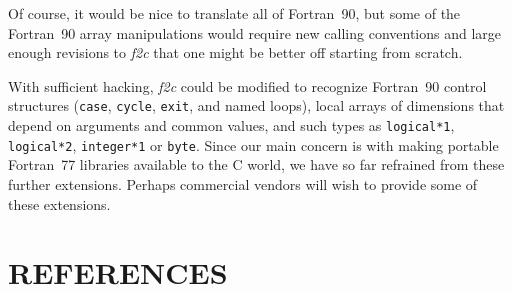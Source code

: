 \documentclass[12pt]{article}
\begin{document}
Of course, it would be nice to translate all of Fortran~90, but some of the Fortran~90 array manipulations would require new calling conventions and large enough revisions to \emph{f2c} that one might be better off starting from scratch.

With sufficient hacking, \emph{f2c} could be modified to recognize Fortran~90 control structures (\verb|case|, \verb|cycle|, \verb|exit|, and named loops), local arrays of dimensions that depend on arguments and common values, and such types as \verb|logical*1|, \verb|logical*2|, \verb|integer*1| or \verb|byte|. Since our main concern is with making portable Fortran~77 libraries available to the C world, we have so far refrained from these further extensions. Perhaps commercial vendors will wish to provide some of these extensions.

\section{REFERENCES}
\end{document}
